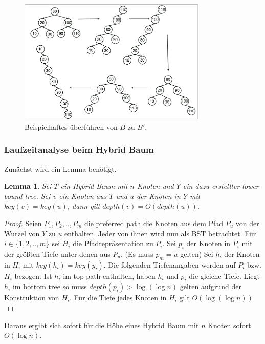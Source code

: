 \documentclass[a4paper,12pt]{article}
\begin{document}
\begin{figure}[h]
	\centering
	\includegraphics[width= 0.8\textwidth]{"Medien/Zipper/hybrid/listeHybrid"}
	\caption{Beispielhaftes überführen von $B$ zu $B'$. }
	\label{fig:listeHybrid}
\end{figure}
\subsubsection{Laufzeitanalyse beim Hybrid Baum}
Zunächst wird ein Lemma benötigt.
\newtheorem{Lemma5}{Lemma}[section] 
\begin{Lemma5} \label{hybridBalanced}
Sei $T$ ein Hybrid Baum mit $n$ Knoten und $Y$ ein dazu erstellter lower bound tree. Sei $v$ ein Knoten aus $T$ und $u$ der Knoten in $Y$ mit 
$\mathit{key}\left(v\right) = \mathit{key}\left(u\right)$, dann gilt $\mathit{depth}\left(v\right) = O\left(\mathit{depth\left(u\right)}\right)$.
\end{Lemma5}
\begin{proof}
Seien $P_1, P_2,.., P_m$ die preferred path die Knoten aus dem Pfad $P_u$ von der Wurzel von $Y$ zu $u$ enthalten. Jeder von ihnen wird nun als BST betrachtet. Für $i \in \{1, 2,..,m\}$ sei $H_i$ die Pfadrepräsentation zu $P_i$. Sei $p_i$ der Knoten in $P_i$ mit der größten Tiefe unter denen aus $P_u$. (Es muss $p_m = u$ gelten) Sei $h_i$ der Knoten in $H_i$ mit $\mathit{key}\left(h_i\right) = \mathit{key}\left(y_i\right)$. Die folgenden Tiefenangaben werden auf $P_i$ bzw. $H_i$ bezogen. Ist $h_i$ im top path enthalten, haben $h_i$ und $p_i$ die gleiche Tiefe. Liegt $h_i$ im bottom tree so muss $\mathit{depth}\left(p_i\right) > \log\left(\log n\right)$ gelten aufgrund der Konstruktion von $H_i$. Für die Tiefe jedes Knoten in $H_i$ gilt $O\left(\log\left(\log n\right)\right)$    
	
\end{proof}
\noindent Daraus ergibt sich sofort für die Höhe eines Hybrid Baum mit $n$ Knoten sofort $O\left(\log n\right)$.
\end{document}
